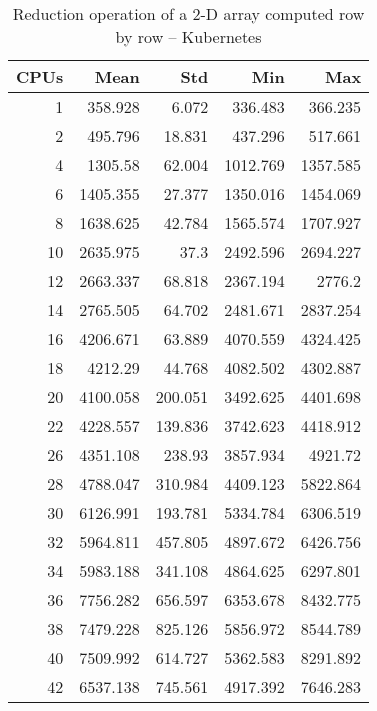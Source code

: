 \begin{table}[htbp]
\begin{minipage}{.45\textwidth}
	\caption{Reduction operation of a 2-D array computed row by row -- bare metal}
	\label{tab:baremetal-reduction-(std)-along-axis}
  \end{minipage}
  \hfill
  \begin{minipage}{.45\textwidth}
    \centering
    \scriptsize
\begin{tabular}{rrrrr}
\toprule
\textbf{CPUs} & \textbf{Mean} & \textbf{Std} & \textbf{Min} & \textbf{Max} \\
\midrule
1 & 358.928 & 6.072 & 336.483 & 366.235 \\
2 & 495.796 & 18.831 & 437.296 & 517.661 \\
4 & 1305.58 & 62.004 & 1012.769 & 1357.585 \\
6 & 1405.355 & 27.377 & 1350.016 & 1454.069 \\
8 & 1638.625 & 42.784 & 1565.574 & 1707.927 \\
10 & 2635.975 & 37.3 & 2492.596 & 2694.227 \\
12 & 2663.337 & 68.818 & 2367.194 & 2776.2 \\
14 & 2765.505 & 64.702 & 2481.671 & 2837.254 \\
16 & 4206.671 & 63.889 & 4070.559 & 4324.425 \\
18 & 4212.29 & 44.768 & 4082.502 & 4302.887 \\
20 & 4100.058 & 200.051 & 3492.625 & 4401.698 \\
22 & 4228.557 & 139.836 & 3742.623 & 4418.912 \\
26 & 4351.108 & 238.93 & 3857.934 & 4921.72 \\
28 & 4788.047 & 310.984 & 4409.123 & 5822.864 \\
30 & 6126.991 & 193.781 & 5334.784 & 6306.519 \\
32 & 5964.811 & 457.805 & 4897.672 & 6426.756 \\
34 & 5983.188 & 341.108 & 4864.625 & 6297.801 \\
36 & 7756.282 & 656.597 & 6353.678 & 8432.775 \\
38 & 7479.228 & 825.126 & 5856.972 & 8544.789 \\
40 & 7509.992 & 614.727 & 5362.583 & 8291.892 \\
42 & 6537.138 & 745.561 & 4917.392 & 7646.283 \\
\bottomrule
\end{tabular}

	\caption{Reduction operation of a 2-D array computed row by row -- Kubernetes}
	\label{tab:kube-reduction-(std)-along-axis}
  \end{minipage}
\end{table}


